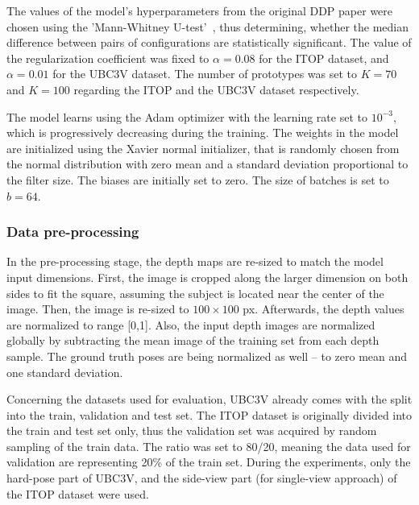 The values of the model's hyperparameters from the original DDP paper were chosen using the 'Mann-Whitney U-test'~\cite{mann1947}, thus determining, whether the median difference between pairs of configurations are statistically significant. The value of the regularization coefficient was fixed to $\alpha = 0.08$ for the ITOP dataset, and $\alpha = 0.01$ for the UBC3V dataset. The number of prototypes was set to $K=70$ and $K=100$ regarding the ITOP and the UBC3V dataset respectively.\par
\vspace{5mm}
\noindent
The model learns using the Adam optimizer with the learning rate set to $10^{-3}$, which is progressively decreasing during the training.  The weights in the model are initialized using the Xavier normal initializer, that is randomly chosen from the normal distribution with zero mean and a standard deviation proportional to the filter size. The biases are initially set to zero. The size of batches is set to $b=64$.

\subsubsection{Data pre-processing}

In the pre-processing stage, the depth maps are re-sized to match the model input dimensions. First, the image is cropped along the larger dimension on both sides to fit the square, assuming the subject is located near the center of the image. Then, the image is re-sized to $100\times100$ px. Afterwards, the depth values are normalized to range [0,1]. Also, the input depth images are normalized globally by subtracting the mean image of the training set from each depth sample. The ground truth poses are being normalized as well – to zero mean and one standard deviation.\par
\vspace{5mm}
\noindent 
Concerning the datasets used for evaluation, UBC3V already comes with the split into the train, validation and test set. The ITOP dataset is originally divided into the train and test set only, thus the validation set was acquired by random sampling of the train data. The ratio was set to 80/20, meaning the data used for validation are representing 20\% of the train set. During the experiments, only the hard-pose part of UBC3V, and the side-view part (for single-view approach) of the ITOP dataset were used.

%

